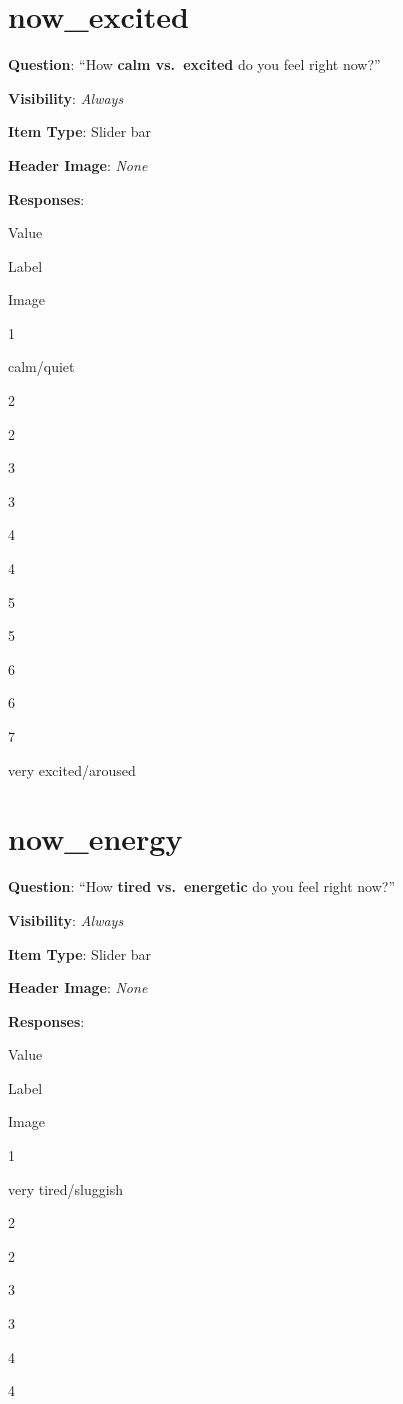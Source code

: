\documentclass[]{book}
\begin{document}
\hypertarget{now_excited}{%
\section{now\_excited}\label{now_excited}}

\textbf{Question}: ``How \textbf{calm vs.~excited} do you feel right now?''

\textbf{Visibility}: \emph{Always}

\textbf{Item Type}: Slider bar

\textbf{Header Image}: \emph{None}

\textbf{Responses}:

Value

Label

Image

1

calm/quiet

2

2

3

3

4

4

5

5

6

6

7

very excited/aroused

\hypertarget{now_energy}{%
\section{now\_energy}\label{now_energy}}

\textbf{Question}: ``How \textbf{tired vs.~energetic} do you feel right now?''

\textbf{Visibility}: \emph{Always}

\textbf{Item Type}: Slider bar

\textbf{Header Image}: \emph{None}

\textbf{Responses}:

Value

Label

Image

1

very tired/sluggish

2

2

3

3

4

4
\end{document}
